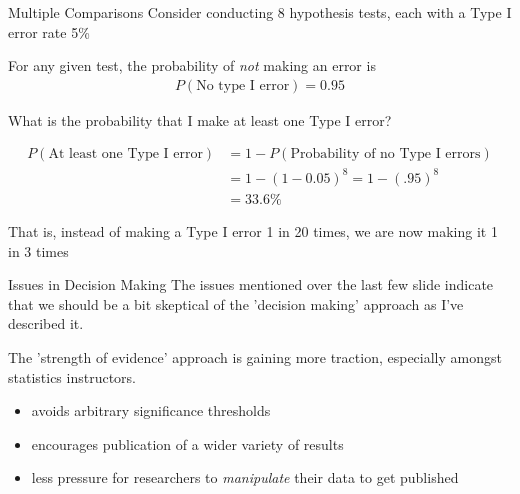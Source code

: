 \documentclass{beamer}
\begin{document}
\begin{frame}{Multiple Comparisons}
Consider conducting 8 hypothesis tests, each with a Type I error rate 5\% \vspace{4mm}


For any given test, the probability of \textit{not} making an error is
\begin{align*}
P(\text{No type I error}) = 0.95
\end{align*} \vspace{2mm}

What is the probability that I make at least one Type I error?

\vspace{-4mm}
\begin{align*}
P(\text{At least one Type I error}) &= 1 - P(\text{Probability of no Type I errors}) \\
&= 1 - (1 - 0.05)^8 = 1 - (.95)^8\\
&= 33.6\%
\end{align*} \vspace{2mm}

That is, instead of making a Type I error 1 in 20 times, we are now making it 1 in 3 times
\end{frame}

\begin{frame}{Issues in Decision Making}
The issues mentioned over the last few slide indicate that we should be a bit skeptical of the 'decision making' approach as I've described it. \vspace{4mm}

The 'strength of evidence' approach is gaining more traction, especially amongst statistics instructors.
\begin{itemize}
    \item avoids arbitrary significance thresholds
    \item encourages publication of a wider variety of results
    \item less pressure for researchers to \textit{manipulate} their data to get published
\end{itemize} \vspace{4mm}


\end{frame}
\end{document}
